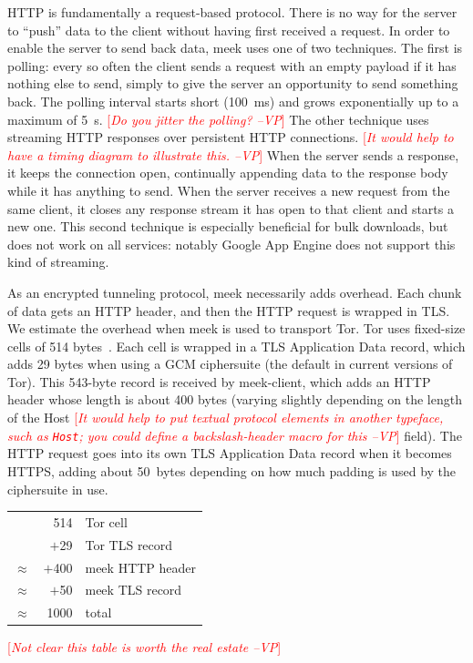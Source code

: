 \documentclass{sig-alternate}
\newcommand{\meekclient}{\mbox{meek-client}\xspace}
\newcommand{\meek}{meek\xspace}
\newcommand{\note}[1]{{\textcolor{red}{[\textit{#1}]}}}
\newcommand{\vp}[1]{\note{#1 --VP}}
\begin{document}
HTTP is fundamentally a request-based protocol.
There is no way for the server to ``push'' data to the client without
having first received a request.
In order to enable the server to send back data,
\meek uses one of two techniques.
The first is polling:
every so often the client sends a request with an empty payload
if it has nothing else to send,
simply to give the server an opportunity to send something back.
The polling interval starts short (100~ms) and grows exponentially
up to a maximum of 5~s.  \vp{Do you jitter the polling?}
The other technique
uses streaming HTTP responses over persistent HTTP connections.
\vp{It would help to have a timing diagram to illustrate this.}
When the server sends a response, it keeps the connection open,
continually appending data to the response body while it has anything to send.
When the server receives a new request from the same client,
it closes any response stream it has open to that client and starts a new one.
This second technique is especially beneficial for bulk downloads,
but does not work on all services:
notably Google App Engine does not support this kind of streaming.

As an encrypted tunneling protocol, meek necessarily adds overhead.
Each chunk of data gets an HTTP header, and then the HTTP
request is wrapped in TLS.
We estimate the overhead when meek is used to transport Tor.
Tor uses fixed-size cells of 514 bytes~\cite[\S 0.2]{tor-spec}.
Each cell is wrapped in a TLS Application Data record, which adds 29 bytes
when using a GCM ciphersuite (the default in current versions of Tor).
This 543-byte record is received by \meekclient,
which adds an HTTP header whose length is about 400 bytes
(varying slightly depending on the length of the Host
\vp{It would help to put textual protocol elements in another typeface,
such as \texttt{Host}; you could define a backslash-header macro for this}
field).
The HTTP request goes into its own TLS Application Data record when it becomes HTTPS,
adding about 50~bytes
depending on how much padding is used by the ciphersuite in use.


\begin{center}
\begin{tabular}{r@{}r l}
          &    514 & Tor cell \\
          &  $+$29 & Tor TLS record \\
$\approx$ & $+$400 & \meek HTTP header \\
$\approx$ &  $+$50 & \meek TLS record \\
\hline
$\approx$ &   1000 & total
\end{tabular}
\end{center}
\vp{Not clear this table is worth the real estate}
\end{document}
